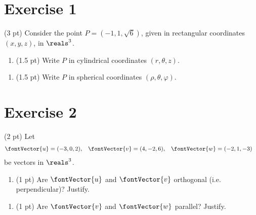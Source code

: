 \section{Exercise 1}

(3 pt) Consider the point $P = (-1,1,\sqrt{6})$, given in rectangular coordinates $(x,y,z)$, in $\reals^{3}$.
\begin{enumerate}[label=(\alph*)]
\item (1.5 pt) Write $P$ in cylindrical coordinates $(r,\theta,z)$.
\end{enumerate}

\spaceSolution{1.5in}{}



\begin{enumerate}[resume,label=(\alph*)]
\item (1.5 pt) Write $P$ in spherical coordinates $(\rho,\theta,\varphi)$.
\end{enumerate}

\spaceSolution{1.5in}{}





\section{Exercise 2}

(2 pt) Let
\begin{align*}
\fontVector{u}
&=
(-3,0,2),
&
\fontVector{v}
&=
(4,-2,6),
&
\fontVector{w}
&=
(-2,1,-3)
\end{align*}
be vectors in $\reals^{3}$.
\begin{enumerate}[label=(\alph*)]
\item (1 pt) Are $\fontVector{u}$ and $\fontVector{v}$ orthogonal (i.e. perpendicular)? Justify.
\end{enumerate}

\spaceSolution{1in}{}



\begin{enumerate}[resume,label=(\alph*)]
\item (1 pt) Are $\fontVector{v}$ and $\fontVector{w}$ parallel? Justify.
\end{enumerate}

\spaceSolution{1in}{}